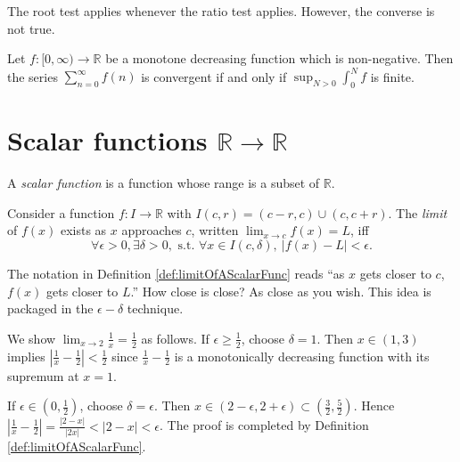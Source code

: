 \begin{rem}
  The root test applies whenever the ratio test applies.
  However, the converse is not true.
\end{rem}

\begin{thm}
  \label{thm:integralTest}
  Let $f:[0, \infty)\rightarrow \mathbb{R}$
   be a monotone decreasing function 
   which is non-negative.
  Then the series $\sum_{n=0}^{\infty}f(n)$ is convergent if and only if
   $\sup_{N>0}\int_0^N f$ is finite.
\end{thm}


\section{Scalar functions
  $\mathbb{R}\rightarrow\mathbb{R}$}
\label{sec:cont-funct-on-R}

\begin{defn}
  A \emph{scalar function} is a function
   whose range is a subset of $\mathbb{R}$.
\end{defn}

\begin{defn}
  \label{def:limitOfAScalarFunc}
  Consider a function $f: I\rightarrow \mathbb{R}$
   with $I(c,r)=(c-r,c)\cup (c,c+r)$.
  The \emph{limit} of $f(x)$  exists
   as $x$ approaches $c$, written
     $\lim_{x\rightarrow c} f(x) = L$,
  iff 
  \begin{equation}
 \forall \epsilon>0, \exists \delta>0, \text{ s.t. }
    \forall x\in I(c,\delta),\ |f(x)-L|<\epsilon.
  \end{equation}
\end{defn}

\begin{rem}
  The notation in Definition \ref{def:limitOfAScalarFunc}
  reads ``as $x$ gets closer to $c$,
 $f(x)$ gets closer to $L$.''
How close is close?
As close as you wish.
This idea is packaged in the $\epsilon-\delta$ technique.
\end{rem}

\begin{exm}
  \label{exm:limitForShowingEpsDelta}
   We show $\lim_{x\rightarrow 2}\frac{1}{x}= \frac{1}{2}$ as follows.
   If $\epsilon\ge \frac{1}{2}$,
   choose $\delta=1$.
   Then $x\in(1,3)$ implies
   $\left|\frac{1}{x}-\frac{1}{2}\right|<\frac{1}{2}$
   since $\frac{1}{x}-\frac{1}{2}$
   is a monotonically decreasing function
   with its supremum at $x=1$.

  If $\epsilon\in (0,\frac{1}{2})$,
   choose $\delta=\epsilon$.
  Then $x\in (2-\epsilon,2+\epsilon)\subset
  (\frac{3}{2},\frac{5}{2})$.
  Hence
  $\left|\frac{1}{x}-\frac{1}{2}\right|=\frac{|2-x|}{|2x|}<|2-x|<\epsilon$.
  The proof is completed by Definition \ref{def:limitOfAScalarFunc}.
\end{exm}

